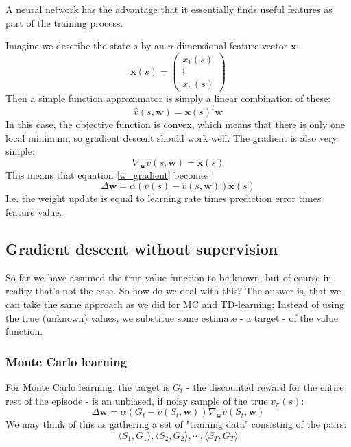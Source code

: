 \documentclass[12pt, a4paper]{article}
\numberwithin{equation}{section}
\begin{document}
A neural network has the advantage that it essentially finds useful features as part of the training process.

Imagine we describe the state $s$ by an $n$-dimensional feature vector $\mathbf{x}$:
\begin{equation}
\mathbf{x}(s)=
\begin{pmatrix}
x_1(s)\\
\vdots \\
x_n(s)
\end{pmatrix}
\end{equation}
Then a simple function approximator is simply a linear combination of these:
\begin{equation}
\hat{v}(s,\mathbf{w})=\mathbf{x}(s)^t\mathbf{w}
\end{equation}
In this case, the objective function is convex, which means that there is only one local minimum, so gradient descent should work well. The gradient is also very simple:
\begin{equation}
\nabla_\mathbf{w}\hat{v}(s,\mathbf{w})=\mathbf{x}(s)
\end{equation}
This means that equation \ref{w_gradient} becomes:
\begin{equation}
\Delta\mathbf{w}=\alpha(v(s)-\hat{v}(s,\mathbf{w}))\mathbf{x}(s)
\end{equation}
I.e. the weight update is equal to learning rate times prediction error times feature value.

\subsection{Gradient descent without supervision}
So far we have assumed the true value function to be known, but of course in reality that's not the case. So how do we deal with this? The answer is, that we can take the same approach as we did for MC and TD-learning: Instead of using the true (unknown) values, we substitue some estimate - a target - of the value function.

\subsubsection{Monte Carlo learning}
For Monte Carlo learning, the target is $G_t$ - the discounted reward for the entire rest of the episode - is an unbiased, if noisy sample of the true $v_\pi(s)$:
\begin{equation}
\Delta\mathbf{w}=\alpha(G_t-\hat{v}(S_t,\mathbf{w}))\nabla_\mathbf{w}\hat{v}(S_t,\mathbf{w})
\end{equation}
We may think of this as gathering a set of "training data" consisting of the pairs:
\begin{equation}
\langle S_1,G_1\rangle,\langle S_2,G_2\rangle,\cdots,\langle S_T,G_T\rangle
\end{equation}
\end{document}
